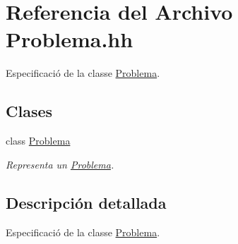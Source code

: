 \hypertarget{_problema_8hh}{}\section{Referencia del Archivo Problema.\+hh}
\label{_problema_8hh}


Especificació de la classe \mbox{\hyperlink{class_problema}{Problema}}.  


\subsection*{Clases}
\begin{DoxyCompactItemize}
\item 
class \mbox{\hyperlink{class_problema}{Problema}}
\begin{DoxyCompactList}\small\item\em Representa un \mbox{\hyperlink{class_problema}{Problema}}. \end{DoxyCompactList}\end{DoxyCompactItemize}


\subsection{Descripción detallada}
Especificació de la classe \mbox{\hyperlink{class_problema}{Problema}}. 

